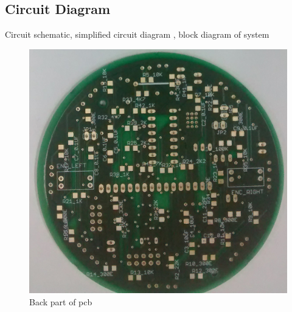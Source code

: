 \documentclass[a4paper,12pt,oneside]{book}
\begin{document}
\subsection*{Circuit Diagram}
Circuit schematic, simplified circuit diagram , block diagram of system
\hfill\\
\begin{figure}[h!]
	\caption{Back part of pcb}
	\includegraphics[width=\textwidth]{./Pictures/PCB_back}		
\end{figure}	
\hfill\\
\end{document}
